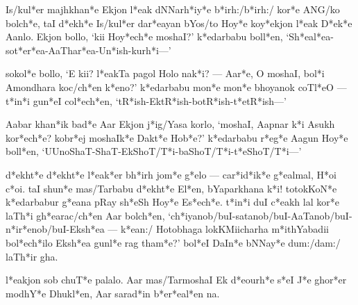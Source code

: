Is/ku\*l*er majhkha\*n*e Ekjon \*l*eak dNNa\*rh*i\*y*e
\*b*irh:/\*b*irh:/ ko\*r*e ANG/ko bol\*ch*e, taI \*d*e\*kh*e Is/ku\*l*er
da\*r*eayan bYos/to Ho\*y*e ko\*y*ekjon \*l*eak \*D*e\*k*e
Aanlo. Ekjon bollo, `kii Ho\*y*e\*ch*e moshaI?' \*k*edarbabu
bol\*l*en,
`\*Sh*ea\*l*ea-so\*t*e\*r*ea-AaTha\*r*ea-U\*n*ish-ku\*rh*i---'

soko\*l*e bollo, `E kii? \*l*eakTa pagol Holo na\*k*i? --- Aa\*r*e, O
moshaI, bo\*l*i Amondhara ko\*c/ch*en \*k*eno?' \*k*edarbabu mo\*n*e
mo\*n*e bhoyanok coT\*l*eO --- \*t*i\*n*i gu\*n*eI co\*l*e\*ch*en,
`\*tR*ish-Ek\*tR*ish-bo\*tR*ish-\*t*e\*tR*ish---'

Aabar kha\*n*ik ba\*d*e Aar Ekjon \*j*ig/Yasa korlo, `moshaI, Aapnar
\*k*i Asukh ko\*r*e\*ch*e? kob\*r*ej moshaI\*k*e Dak\*t*e Ho\*b*e?'
\*k*edarbabu \*r*e\*g*e Aagun Ho\*y*e bol\*l*en,
`UUnoShaT-ShaT-EkSho\*T/T*i-baSho\*T/T*i-\*t*eSho\*T/T*i---'

\*d*ekh\*t*e \*d*ekh\*t*e \*l*ea\*k*er \*bh*irh jo\*m*e \*g*elo ---
ca\*r*i\*d*i\*k*e \*g*ealmal, \*H*{oi} \*c*{oi}. taI shu\*n*e
mas/Tarbabu \*d*ekh\*t*e E\*l*en, bYaparkhana \*k*i! totokKo\*N*e
\*k*edarbabur \*g*eana pRay \*sh*eSh Ho\*y*e E\*s*e\*ch*e. \*t*i\*n*i
duI \*c*eakh lal ko\*r*e la\*Th*i \*gh*eara\*c/ch*en Aar bol\*ch*en,
`\*ch*iyanob/buI-satanob/buI-AaTanob/buI-\*n*i\*r*enob/buI-Ek\*sh*ea
--- \*k*ean:/ Hotobhaga lokKMiicharha \*m*ithYabadii bo\*l*e\*ch*ilo
Ek\*sh*ea gun\*l*e rag tha\*m*e?' bo\*l*eI DaI\*n*e bNNa\*y*e
dum:/dam:/ la\*Th*ir gha.

\*l*eakjon sob chu\*T*e palalo. Aar mas/TarmoshaI Ek \*d*eou\*rh*e
\*s*eI \*J*e gho\*r*er mo\*dhY*e Dhuk\*l*en, Aar sara\*d*in
\*b*e\*r*ea\*l*en na.

\bye

